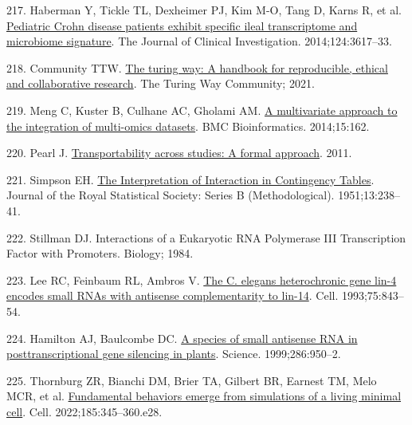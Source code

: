 \documentclass[
  12pt,
  a4paper,
  twoside,
  openright]{book}
\newlength{\cslhangindent}
\newlength{\cslentryspacingunit} %
\newenvironment{CSLReferences}[2] %
 {%
  \setlength{\parindent}{0pt}
  \ifodd #1
  \let\oldpar\par
  \def\par{\hangindent=\cslhangindent\oldpar}
  \fi
  \setlength{\parskip}{#2\cslentryspacingunit}
 }%
 {}
\begin{document}
\begin{CSLReferences}{0}{0}
\leavevmode{}%
217. Haberman Y, Tickle TL, Dexheimer PJ, Kim M-O, Tang D, Karns R, et al. \href{https://doi.org/10.1172/JCI75436}{Pediatric Crohn disease patients exhibit specific ileal transcriptome and microbiome signature}. The Journal of Clinical Investigation. 2014;124:3617--33.

\leavevmode{}%
218. Community TTW. \href{https://doi.org/10.5281/ZENODO.3233853}{The turing way: A handbook for reproducible, ethical and collaborative research}. The Turing Way Community; 2021.

\leavevmode{}%
219. Meng C, Kuster B, Culhane AC, Gholami AM. \href{https://doi.org/10.1186/1471-2105-15-162}{A multivariate approach to the integration of multi-omics datasets}. BMC Bioinformatics. 2014;15:162.

\leavevmode{}%
220. Pearl J. \href{https://escholarship.org/uc/item/3tv1b3bg}{Transportability across studies: A formal approach}. 2011.

\leavevmode{}%
221. Simpson EH. \href{https://doi.org/10.1111/j.2517-6161.1951.tb00088.x}{The Interpretation of Interaction in Contingency Tables}. Journal of the Royal Statistical Society: Series B (Methodological). 1951;13:238--41.

\leavevmode{}%
222. Stillman DJ. Interactions of a Eukaryotic RNA Polymerase III Transcription Factor with Promoters. Biology; 1984.

\leavevmode{}%
223. Lee RC, Feinbaum RL, Ambros V. \href{https://doi.org/10.1016/0092-8674(93)90529-Y}{The C. elegans heterochronic gene lin-4 encodes small RNAs with antisense complementarity to lin-14}. Cell. 1993;75:843--54.

\leavevmode{}%
224. Hamilton AJ, Baulcombe DC. \href{https://doi.org/10.1126/science.286.5441.950}{A species of small antisense RNA in posttranscriptional gene silencing in plants}. Science. 1999;286:950--2.

\leavevmode{}%
225. Thornburg ZR, Bianchi DM, Brier TA, Gilbert BR, Earnest TM, Melo MCR, et al. \href{https://doi.org/10.1016/j.cell.2021.12.025}{Fundamental behaviors emerge from simulations of a living minimal cell}. Cell. 2022;185:345--360.e28.


\end{CSLReferences}
\end{document}
